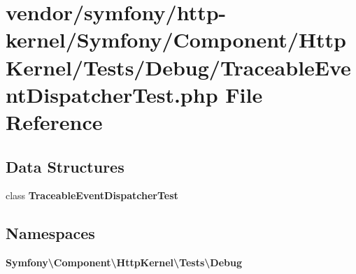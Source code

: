 \section{vendor/symfony/http-\/kernel/\+Symfony/\+Component/\+Http\+Kernel/\+Tests/\+Debug/\+Traceable\+Event\+Dispatcher\+Test.php File Reference}
\label{http-kernel_2_symfony_2_component_2_http_kernel_2_tests_2_debug_2_traceable_event_dispatcher_test_8php}
\subsection*{Data Structures}
\begin{DoxyCompactItemize}
\item 
class {\bf Traceable\+Event\+Dispatcher\+Test}
\end{DoxyCompactItemize}
\subsection*{Namespaces}
\begin{DoxyCompactItemize}
\item 
 {\bf Symfony\textbackslash{}\+Component\textbackslash{}\+Http\+Kernel\textbackslash{}\+Tests\textbackslash{}\+Debug}
\end{DoxyCompactItemize}
